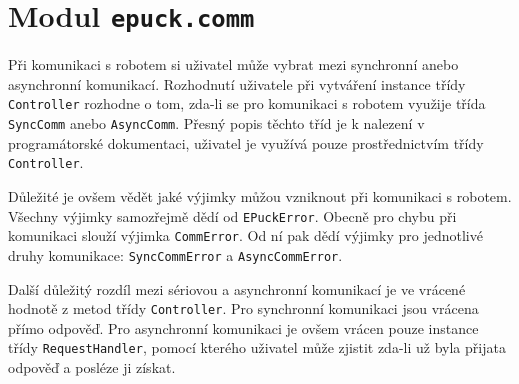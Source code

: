\documentclass[12pt,notitlepage]{report}
\newcommand{\code}[1]{\texttt{\small #1}}
\begin{document}
\section{Modul {\tt epuck.comm}}
Při komunikaci s robotem si uživatel může vybrat mezi synchronní anebo
asynchronní komunikací. Rozhodnutí uživatele při vytváření instance třídy
\code{Controller} rozhodne o tom, zda-li se pro komunikaci s robotem využije
třída \code{SyncComm} anebo \code{AsyncComm}. Přesný popis těchto tříd je k
nalezení v programátorské dokumentaci, uživatel je využívá pouze
prostřednictvím třídy \code{Controller}.

Důležité je ovšem vědět jaké výjimky můžou vzniknout při komunikaci s robotem.
Všechny výjimky samozřejmě dědí od \code{EPuckError}. Obecně pro chybu při
komunikaci slouží výjimka \code{CommError}. Od ní pak dědí výjimky pro
jednotlivé druhy komunikace: \code{SyncCommError} a \code{AsyncCommError}.

Další důležitý rozdíl mezi sériovou a asynchronní komunikací je ve vrácené
hodnotě z metod třídy \code{Controller}. Pro synchronní komunikaci jsou vrácena
přímo odpověď. Pro asynchronní komunikaci je ovšem vrácen pouze instance třídy
\code{RequestHandler}, pomocí kterého uživatel může zjistit zda-li už byla
přijata odpověď a posléze ji získat.
\end{document}
